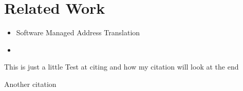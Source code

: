 \chapter{Related Work}

\label{chap:related}



\begin{itemize}
    \item Software Managed Address Translation
    \item
\end{itemize}

This is just a little Test at citing and how my citation will
look at the end \cite{jacobSoftwaremanagedAddressTranslation1997}


Another citation \cite{BuchananRSS08}